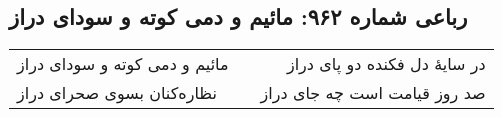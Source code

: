 \begin{center}
\section*{رباعی شماره ۹۶۲: مائیم و دمی کوته و سودای دراز}
\label{sec:0962}
\begin{longtable}{l p{0.5cm} r}
مائیم و دمی کوته و سودای دراز
&&
در سایهٔ دل فکنده دو پای دراز
\\
نظاره‌کنان بسوی صحرای دراز
&&
صد روز قیامت است چه جای دراز
\\
\end{longtable}
\end{center}
